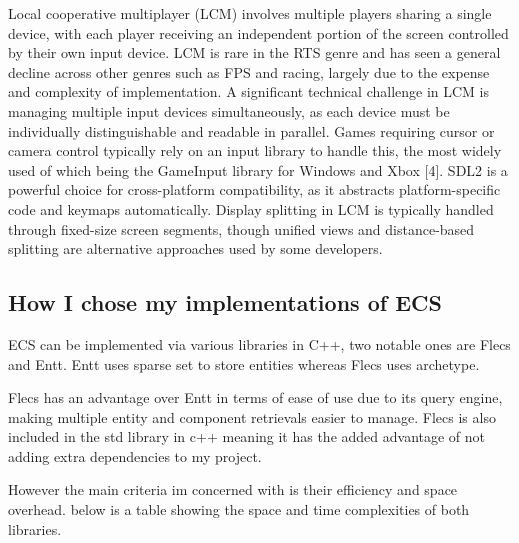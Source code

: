 \documentclass[]{final_report}
\begin{document}
Local cooperative multiplayer (LCM) involves multiple players sharing a single device, with each player receiving an independent portion of the screen controlled by their own input device. LCM is rare in the RTS genre and has seen a general decline across other genres such as FPS and racing, largely due to the expense and complexity of implementation. \newline
A significant technical challenge in LCM is managing multiple input devices simultaneously, as each device must be individually distinguishable and readable in parallel. Games requiring cursor or camera control typically rely on an input library to handle this, the most widely used of which being the GameInput library for Windows and Xbox [4]. SDL2 is a powerful choice for cross-platform compatibility, as it abstracts platform-specific code and keymaps automatically. \newline
Display splitting in LCM is typically handled through fixed-size screen segments, though unified views and distance-based splitting are alternative approaches used by some developers. \newline

\subsection{How I chose my implementations of ECS}
ECS can be implemented via various libraries in C++, two notable ones are Flecs and Entt. Entt uses sparse set to store entities whereas Flecs uses archetype.

Flecs has an advantage over Entt in terms of ease of use due to its query engine, making multiple entity and component retrievals easier to manage. Flecs is also included in the std library in c++ meaning it has the added advantage of not adding extra dependencies to my project.

However the main criteria im concerned with is their efficiency and space overhead. below is a table showing the space and time complexities of both libraries.
\end{document}
